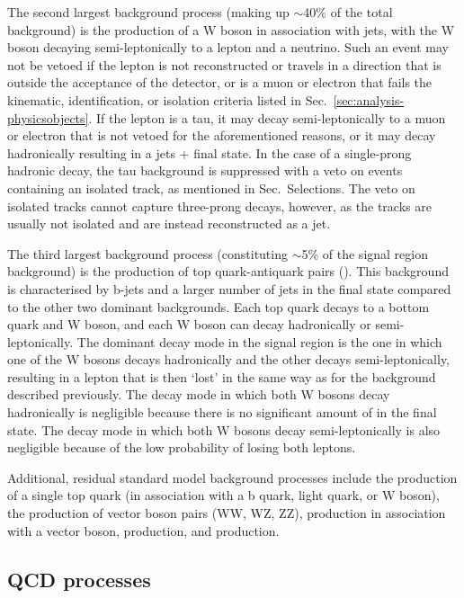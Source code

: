 The second largest background process (making up $\sim$40\% of the total 
background) is the production of a W boson in 
association with jets, with the W boson decaying semi-leptonically to a lepton 
and a neutrino. Such an event may not be vetoed if the lepton is not 
reconstructed or travels in a direction that is outside the acceptance of the 
detector, or is a muon or electron that fails the kinematic, identification, or 
isolation criteria listed in Sec.~\ref{sec:analysis-physicsobjects}. If the 
lepton 
is a tau, it may decay semi-leptonically to a muon or electron that is not 
vetoed for the aforementioned reasons, or it may decay hadronically resulting 
in a jets + \met final state. In the case of a single-prong hadronic decay, the 
tau background is suppressed with a veto on events containing an isolated 
track, as mentioned in Sec.~Selections. The veto on isolated tracks cannot 
capture three-prong decays, however, as the tracks are usually not isolated and 
are instead reconstructed as a jet.

The third largest background process (constituting $\sim$5\% of the signal 
region background) is the production of top quark-antiquark pairs 
(\ttj). This background is characterised by b-jets and a larger number 
of jets in the final state compared to the other two dominant backgrounds.  
Each top quark decays to a bottom quark and W boson, and each W boson can decay 
hadronically or semi-leptonically. The dominant decay mode in the signal region 
is the one in which one of the W bosons decays hadronically and the other 
decays semi-leptonically, resulting in a lepton that is then `lost' in the same 
way as for the \wlj background described previously. The decay mode in which 
both W bosons decay hadronically is negligible because there is no significant 
amount of \met in the final state. The decay mode in which both W bosons decay 
semi-leptonically is also negligible because of the low probability of losing 
both leptons.

Additional, residual standard model background processes include the production 
of a single top quark (in association with a b quark, light quark, or W boson), 
the production of vector boson pairs (WW, WZ, ZZ), \ttbar production in 
association with a vector boson, \zllj production, and \gj production.

\subsection{QCD processes}


